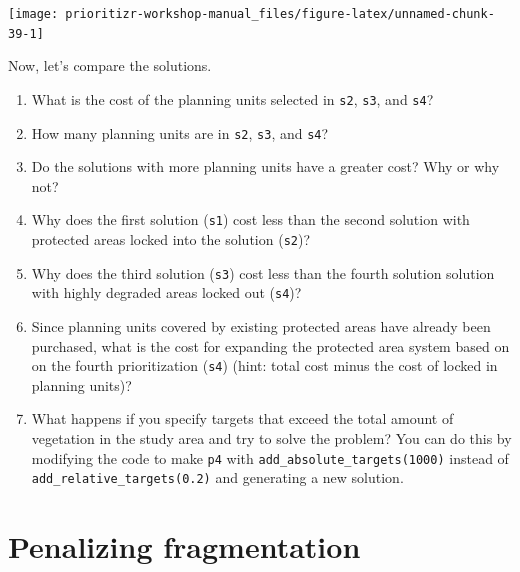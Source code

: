 \documentclass[12pt,]{book}
\providecommand{\tightlist}{%
  \setlength{\itemsep}{0pt}\setlength{\parskip}{0pt}}
\let\BeginKnitrBlock\begin \let\EndKnitrBlock\end
\begin{document}
\begin{center}\texttt{[image: prioritizr-workshop-manual\_files/figure-latex/unnamed-chunk-39-1]} \end{center}

\clearpage

Now, let's compare the solutions.

\BeginKnitrBlock{rmdquestion}
\begin{enumerate}
\def\labelenumi{\arabic{enumi}.}
\tightlist
\item
  What is the cost of the planning units selected in \texttt{s2},
  \texttt{s3}, and \texttt{s4}?
\item
  How many planning units are in \texttt{s2}, \texttt{s3}, and
  \texttt{s4}?
\item
  Do the solutions with more planning units have a greater cost? Why or
  why not?
\item
  Why does the first solution (\texttt{s1}) cost less than the second
  solution with protected areas locked into the solution (\texttt{s2})?
\item
  Why does the third solution (\texttt{s3}) cost less than the fourth
  solution solution with highly degraded areas locked out (\texttt{s4})?
\item
  Since planning units covered by existing protected areas have already
  been purchased, what is the cost for expanding the protected area
  system based on on the fourth prioritization (\texttt{s4}) (hint:
  total cost minus the cost of locked in planning units)?
\item
  What happens if you specify targets that exceed the total amount of
  vegetation in the study area and try to solve the problem? You can do
  this by modifying the code to make \texttt{p4} with
  \texttt{add\_absolute\_targets(1000)} instead of
  \texttt{add\_relative\_targets(0.2)} and generating a new solution.
\end{enumerate}
\EndKnitrBlock{rmdquestion}

\section{Penalizing fragmentation}\label{penalizing-fragmentation}
\end{document}
